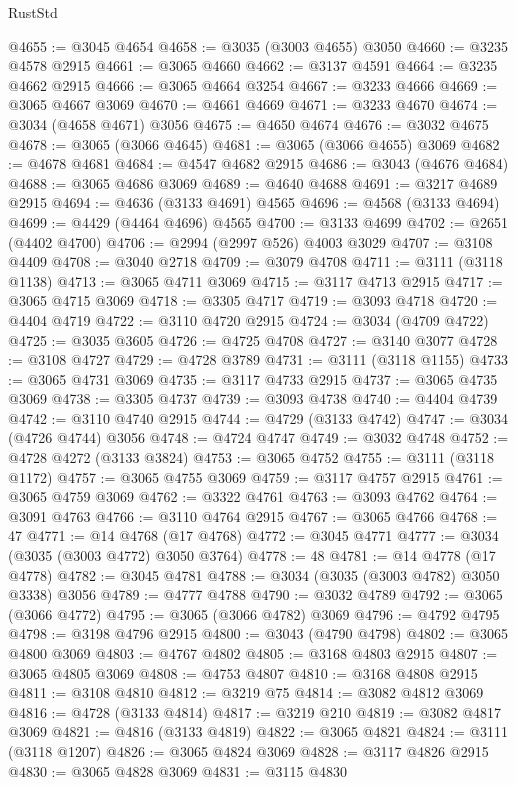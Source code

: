 \begin{lexlean}{RustStd}
\begin{coremodule}
@4655 := @3045 @4654
@4658 := @3035 (@3003 @4655) @3050
@4660 := @3235 @4578 @2915
@4661 := @3065 @4660
@4662 := @3137 @4591
@4664 := @3235 @4662 @2915
@4666 := @3065 @4664 @3254
@4667 := @3233 @4666
@4669 := @3065 @4667 @3069
@4670 := @4661 @4669
@4671 := @3233 @4670
@4674 := @3034 (@4658 @4671) @3056
@4675 := @4650 @4674
@4676 := @3032 @4675
@4678 := @3065 (@3066 @4645)
@4681 := @3065 (@3066 @4655) @3069
@4682 := @4678 @4681
@4684 := @4547 @4682 @2915
@4686 := @3043 (@4676 @4684)
@4688 := @3065 @4686 @3069
@4689 := @4640 @4688
@4691 := @3217 @4689 @2915
@4694 := @4636 (@3133 @4691) @4565
@4696 := @4568 (@3133 @4694)
@4699 := @4429 (@4464 @4696) @4565
@4700 := @3133 @4699
@4702 := @2651 (@4402 @4700)
@4706 := @2994 (@2997 @526) @4003 @3029
@4707 := @3108 @4409
@4708 := @3040 @2718
@4709 := @3079 @4708
@4711 := @3111 (@3118 @1138)
@4713 := @3065 @4711 @3069
@4715 := @3117 @4713 @2915
@4717 := @3065 @4715 @3069
@4718 := @3305 @4717
@4719 := @3093 @4718
@4720 := @4404 @4719
@4722 := @3110 @4720 @2915
@4724 := @3034 (@4709 @4722)
@4725 := @3035 @3605
@4726 := @4725 @4708
@4727 := @3140 @3077
@4728 := @3108 @4727
@4729 := @4728 @3789
@4731 := @3111 (@3118 @1155)
@4733 := @3065 @4731 @3069
@4735 := @3117 @4733 @2915
@4737 := @3065 @4735 @3069
@4738 := @3305 @4737
@4739 := @3093 @4738
@4740 := @4404 @4739
@4742 := @3110 @4740 @2915
@4744 := @4729 (@3133 @4742)
@4747 := @3034 (@4726 @4744) @3056
@4748 := @4724 @4747
@4749 := @3032 @4748
@4752 := @4728 @4272 (@3133 @3824)
@4753 := @3065 @4752
@4755 := @3111 (@3118 @1172)
@4757 := @3065 @4755 @3069
@4759 := @3117 @4757 @2915
@4761 := @3065 @4759 @3069
@4762 := @3322 @4761
@4763 := @3093 @4762
@4764 := @3091 @4763
@4766 := @3110 @4764 @2915
@4767 := @3065 @4766
@4768 := 47
@4771 := @14 @4768 (@17 @4768)
@4772 := @3045 @4771
@4777 := @3034 (@3035 (@3003 @4772) @3050 @3764)
@4778 := 48
@4781 := @14 @4778 (@17 @4778)
@4782 := @3045 @4781
@4788 := @3034 (@3035 (@3003 @4782) @3050 @3338) @3056
@4789 := @4777 @4788
@4790 := @3032 @4789
@4792 := @3065 (@3066 @4772)
@4795 := @3065 (@3066 @4782) @3069
@4796 := @4792 @4795
@4798 := @3198 @4796 @2915
@4800 := @3043 (@4790 @4798)
@4802 := @3065 @4800 @3069
@4803 := @4767 @4802
@4805 := @3168 @4803 @2915
@4807 := @3065 @4805 @3069
@4808 := @4753 @4807
@4810 := @3168 @4808 @2915
@4811 := @3108 @4810
@4812 := @3219 @75
@4814 := @3082 @4812 @3069
@4816 := @4728 (@3133 @4814)
@4817 := @3219 @210
@4819 := @3082 @4817 @3069
@4821 := @4816 (@3133 @4819)
@4822 := @3065 @4821
@4824 := @3111 (@3118 @1207)
@4826 := @3065 @4824 @3069
@4828 := @3117 @4826 @2915
@4830 := @3065 @4828 @3069
@4831 := @3115 @4830

\end{coremodule}
\end{lexlean}
